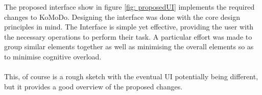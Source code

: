 \pagebreak
%
The proposed interface show in figure \ref{fig: proposedUI} implements the required changes to KoMoDo. Designing the interface was done with the core design principles \cite{design_principles} in mind. The Interface is simple yet effective, providing the user with the necessary operations to perform their task. A particular effort was made to group similar elements together as well as minimising the overall elements so as to minimise cognitive overload.\\\\
%
This, of course is a rough sketch with the eventual UI potentially being different, but it provides a good overview of the proposed changes.
